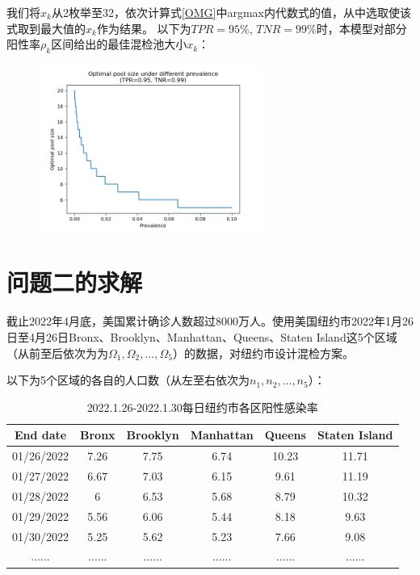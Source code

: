 \documentclass[withoutpreface,bwprint]{cumcmthesis} %
\begin{document}
我们将$x_k$从2枚举至32，依次计算式\ref{OMG}中argmax内代数式的值，从中选取使该式取到最大值的$x_k$作为结果。
以下为$TPR=95\%$, $TNR=99\%$时，本模型对部分阳性率$\rho_k$区间给出的最佳混检池大小$x_k$：
\begin{figure}[H]
\centering
\includegraphics[width=0.65\textwidth]{model2_sample.png}
\label{model2_sample}
\end{figure}
\section{问题二的求解}
截止2022年4月底，美国累计确诊人数超过8000万人。使用美国纽约市2022年1月26日至4月26日Bronx、Brooklyn、Manhattan、Queens、Staten Island这5个区域（从前至后依次为为$\Omega_1 ,\Omega_2 ,...,\Omega_5$）的数据，对纽约市设计混检方案。

以下为5个区域的各自的人口数（从左至右依次为$n_1,n_2,...,n_5$）：

\begin{table}[H]
\centering
\begin{tabular}{cccccc}
\toprule
End date   & Bronx & Brooklyn & Manhattan & Queens & Staten Island \\ 
\midrule
01/26/2022 & 7.26  & 7.75     & 6.74      & 10.23  & 11.71         \\
01/27/2022 & 6.67  & 7.03     & 6.15      & 9.61   & 11.19         \\
01/28/2022 & 6     & 6.53     & 5.68      & 8.79   & 10.32         \\
01/29/2022 & 5.56  & 6.06     & 5.44      & 8.18   & 9.63          \\
01/30/2022 & 5.25  & 5.62     & 5.23      & 7.66   & 9.08          \\
......     & ...... &...... &...... &...... &...... \\
\bottomrule
\end{tabular}
\caption{2022.1.26-2022.1.30每日纽约市各区阳性感染率}
\end{table}
\end{document}
